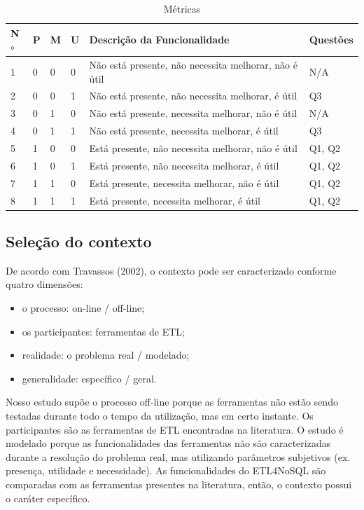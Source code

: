 \begin{table}[ht!]
	\centering
	\caption{Métricas}
	\label{metricas}
	\begin{tabular}{|p{0.5cm}| p{0.5cm} | p{0.5cm}| p{0.5cm}|p{9cm}|p{3cm}|}
		\hline
		N$\circ$ & P & M & U & Descrição da Funcionalidade & Questões\\
		\hline
		1 & 0 & 0 & 0 & Não está presente, não necessita melhorar, não é útil & N/A\\
		\hline
		2 & 0 & 0 & 1 & Não está presente, não necessita melhorar, é útil & Q3\\
		\hline
		3 & 0 & 1 & 0 & Não está presente, necessita melhorar, não é útil & N/A\\
		\hline
		4 & 0 & 1 & 1 & Não está presente, necessita melhorar, é útil & Q3\\
		\hline
		5 & 1 & 0 & 0 & Está presente, não necessita melhorar, não é útil & Q1, Q2\\
		\hline
		6 & 1 & 0 & 1 & Está presente, não necessita melhorar, é útil & Q1, Q2\\
		\hline
		7 & 1 & 1 & 0 & Está presente, necessita melhorar, não é útil & Q1, Q2\\
		\hline
		8 & 1 & 1 & 1 & Está presente, necessita melhorar, é útil & Q1, Q2\\
		\hline
		
		
		
	\end{tabular}
\end{table}	

\subsection{Seleção do contexto}

De acordo com Travassos (2002), o contexto pode ser caracterizado conforme quatro dimensões:

\begin{itemize}
	\item o processo: on-line / off-line;
	\item os participantes: ferramentas de ETL;
	\item realidade: o problema real / modelado;
	\item generalidade: específico / geral.
\end{itemize}

Nosso estudo supõe o processo off-line porque as ferramentas não estão sendo testadas durante todo o tempo da utilização, mas em certo instante. Os participantes são as ferramentas de ETL encontradas na literatura. O estudo é modelado porque as funcionalidades das ferramentas não são caracterizadas durante a resolução do problema real, mas utilizando parâmetros subjetivos (ex. presença, utilidade e necessidade). As funcionalidades do ETL4NoSQL são comparadas com as ferramentas presentes na literatura, então, o contexto possui o caráter específico.

